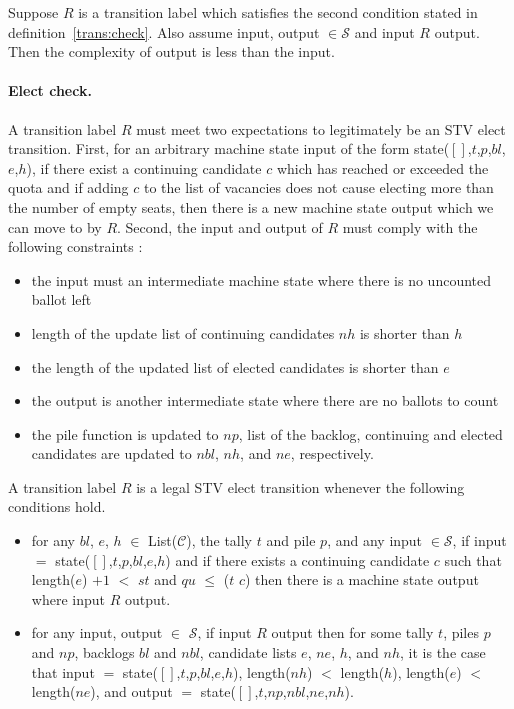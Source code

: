 \documentclass{llncs}
\begin{document}
\begin{theorem}\label{trans:red}
Suppose $R$ is a transition label which satisfies the second condition stated in definition~\ref{trans:check}. Also assume \textsf{input}, \textsf{output} $\in\mathcal{S}$ and \textsf{input} $R$ \textsf{output}. Then the complexity of \textsf{output} is less than the \textsf{input}.  
\end{theorem}
\paragraph{Elect check.}
A transition label $R$ must meet two expectations to legitimately be an STV elect transition. First, for an arbitrary machine state \textsf{input} of the form \textsf{state}($[]$,$t$,$p$,$bl$,$e$,$h$), if there exist a continuing candidate $c$ which has reached or exceeded the  quota and if adding $c$ to the list of vacancies does not cause electing more than the number of empty seats, then there is a new machine state \textsf{output} which we can move to by $R$. Second, the input and output of $R$ must comply with the following constraints :
\begin{itemize}
\item the input must an intermediate machine state where there is no uncounted ballot left
\item length of the update list of continuing candidates $nh$ is shorter than $h$
\item the length of the updated list of elected candidates is shorter than $e$
\item the output is another intermediate state where there are no ballots to count
\item the pile function is updated to $np$, list of the backlog, continuing and elected candidates are updated to $nbl$, $nh$, and $ne$, respectively.
\end{itemize}   
\begin{definition}\label{elect:check}
A transition label $R$ is a legal STV elect transition whenever the following conditions hold.
\begin{itemize}
\item for any $bl$, $e$, $h$ $\in$ \textsf{List}($\mathcal{C}$), the tally $t$ and pile $p$, and any \textsf{input} $\in\mathcal{S}$, if \textsf{input} $=$ \textsf{state}($[]$,$t$,$p$,$bl$,$e$,$h$) and if there exists a continuing candidate $c$ such that \textsf{length}($e$) $+ 1$ $<$ $st$ and $qu$ $\leq$ ($t$ $c$) then there is a machine state \textsf{output} where \textsf{input} $R$ \textsf{output}.
\item for any \textsf{input}, \textsf{output} $\in$ $\mathcal{S}$, if \textsf{input} $R$ \textsf{output} then for some tally $t$, piles $p$ and $np$, backlogs $bl$ and $nbl$, candidate lists $e$, $ne$, $h$, and $nh$, it is the case that  
 \textsf{input} $=$ \textsf{state}($[]$,$t$,$p$,$bl$,$e$,$h$), \textsf{length}($nh$) $<$ \textsf{length}($h$), \textsf{length}($e$) $<$ \textsf{length}($ne$), and \textsf{output} $=$ \textsf{state}($[]$,$t$,$np$,$nbl$,$ne$,$nh$). 
\end{itemize}
\end{definition}
\end{document}
